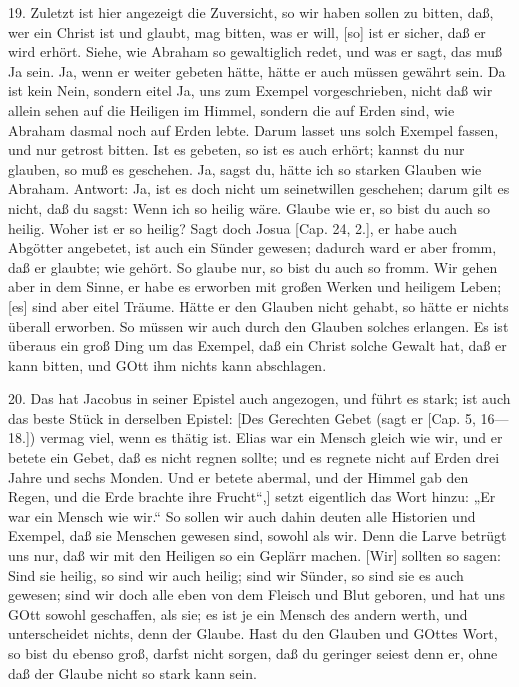 19. Zuletzt ist hier angezeigt die Zuversicht, so wir haben sollen zu bitten, daß, wer ein Christ ist und glaubt, mag bitten, was er will, [so] ist er sicher, daß er wird erhört. Siehe, wie Abraham so gewaltiglich redet, und was er sagt, das muß Ja sein. Ja, wenn er weiter gebeten hätte, hätte er auch müssen gewährt sein. Da ist kein Nein, sondern eitel Ja, uns zum Exempel vorgeschrieben, nicht daß wir allein sehen auf die Heiligen im Himmel, sondern die auf Erden sind, wie Abraham dasmal noch auf Erden lebte. Darum lasset uns solch Exempel fassen, und nur getrost bitten. Ist es gebeten, so ist es auch erhört; kannst du nur glauben, so muß es geschehen. Ja, sagst du, hätte ich so starken Glauben wie Abraham. Antwort: Ja, ist es doch nicht um seinetwillen geschehen; darum gilt es nicht, daß du sagst: Wenn ich so heilig wäre. Glaube wie er, so bist du auch so heilig. Woher ist er so heilig? Sagt doch Josua [Cap. 24, 2.], er habe auch Abgötter angebetet, ist auch ein Sünder gewesen; dadurch ward er aber fromm, daß er glaubte; wie gehört. So glaube nur, so bist du auch so fromm. Wir gehen aber in dem Sinne, er habe es erworben mit großen Werken und heiligem Leben; [es] sind aber eitel Träume. Hätte er den Glauben nicht gehabt, so hätte er nichts überall erworben. So müssen wir auch durch den Glauben solches erlangen. Es ist überaus ein groß Ding um das Exempel, daß ein Christ solche Gewalt hat, daß er kann bitten, und GOtt ihm nichts kann abschlagen.

20. Das hat Jacobus in seiner Epistel auch angezogen, und führt es stark; ist auch das beste Stück in derselben Epistel: [Des Gerechten Gebet (sagt er [Cap. 5, 16—18.]) vermag viel, wenn es thätig ist. Elias war ein Mensch gleich wie wir, und er betete ein Gebet, daß es nicht regnen sollte; und es regnete nicht auf Erden drei Jahre und sechs Monden. Und er betete abermal, und der Himmel gab den Regen, und die Erde brachte ihre Frucht“,] setzt eigentlich das Wort hinzu: „Er war ein Mensch wie wir.“ So sollen wir auch dahin deuten alle Historien und Exempel, daß sie Menschen gewesen sind, sowohl als wir. Denn die Larve betrügt uns nur, daß wir mit den Heiligen so ein Geplärr machen. [Wir] sollten so sagen: Sind sie heilig, so sind wir auch heilig; sind wir Sünder, so sind sie es auch gewesen; sind wir doch alle eben von dem Fleisch und Blut geboren, und hat uns GOtt sowohl geschaffen, als sie; es ist je ein Mensch des andern werth, und unterscheidet nichts, denn der Glaube. Hast du den Glauben und GOttes Wort, so bist du ebenso groß, darfst nicht sorgen, daß du geringer seiest denn er, ohne daß der Glaube nicht so stark kann sein.

